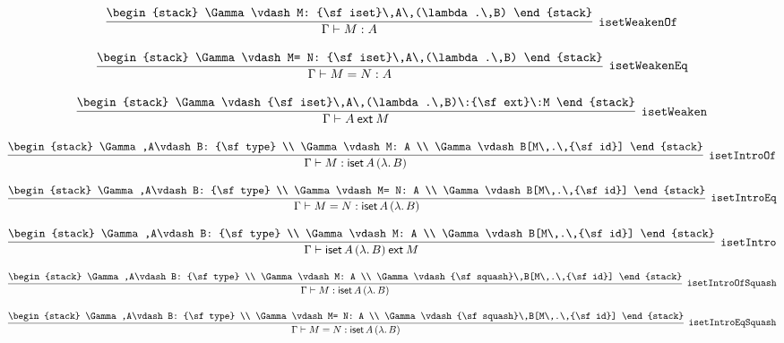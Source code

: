 \[
\infer[{\tt isetWeakenOf}]{\Gamma \vdash M: A}{
\begin{stack}
\Gamma \vdash M: {\sf iset}\,A\,(\lambda .\,B)
\end{stack}}
\]

\[
\infer[{\tt isetWeakenEq}]{\Gamma \vdash M= N: A}{
\begin{stack}
\Gamma \vdash M= N: {\sf iset}\,A\,(\lambda .\,B)
\end{stack}}
\]

\[
\infer[{\tt isetWeaken}]{\Gamma \vdash A\:{\sf ext}\:M}{
\begin{stack}
\Gamma \vdash {\sf iset}\,A\,(\lambda .\,B)\:{\sf ext}\:M
\end{stack}}
\]

\[
\infer[{\tt isetIntroOf}]{\Gamma \vdash M: {\sf iset}\,A\,(\lambda .\,B)}{
\begin{stack}
\Gamma ,A\vdash B: {\sf type}
\\
\Gamma \vdash M: A
\\
\Gamma \vdash B[M\,.\,{\sf id}]
\end{stack}}
\]

\[
\infer[{\tt isetIntroEq}]{\Gamma \vdash M= N: {\sf iset}\,A\,(\lambda .\,B)}{
\begin{stack}
\Gamma ,A\vdash B: {\sf type}
\\
\Gamma \vdash M= N: A
\\
\Gamma \vdash B[M\,.\,{\sf id}]
\end{stack}}
\]

\[
\infer[{\tt isetIntro}]{\Gamma \vdash {\sf iset}\,A\,(\lambda .\,B)\:{\sf ext}\:M}{
\begin{stack}
\Gamma ,A\vdash B: {\sf type}
\\
\Gamma \vdash M: A
\\
\Gamma \vdash B[M\,.\,{\sf id}]
\end{stack}}
\]

\[
\infer[{\tt isetIntroOfSquash}]{\Gamma \vdash M: {\sf iset}\,A\,(\lambda .\,B)}{
\begin{stack}
\Gamma ,A\vdash B: {\sf type}
\\
\Gamma \vdash M: A
\\
\Gamma \vdash {\sf squash}\,B[M\,.\,{\sf id}]
\end{stack}}
\]

\[
\infer[{\tt isetIntroEqSquash}]{\Gamma \vdash M= N: {\sf iset}\,A\,(\lambda .\,B)}{
\begin{stack}
\Gamma ,A\vdash B: {\sf type}
\\
\Gamma \vdash M= N: A
\\
\Gamma \vdash {\sf squash}\,B[M\,.\,{\sf id}]
\end{stack}}
\]

